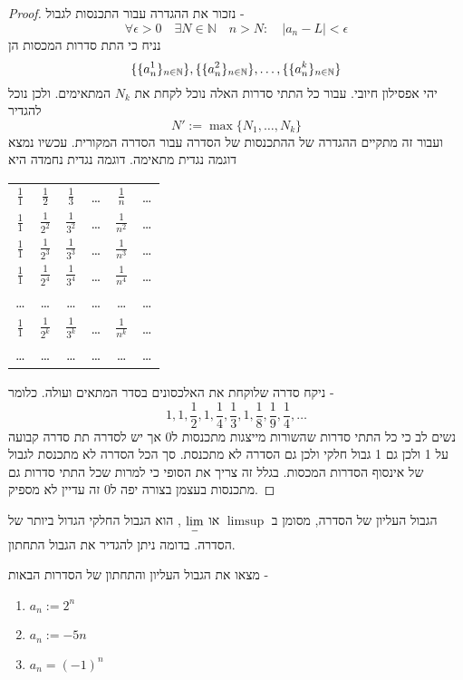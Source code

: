 \documentclass{article}
\begin{document}
\begin{proof}
נזכור את ההגדרה עבור התכנסות לגבול - 
\[\forall\epsilon>0\quad \exists N\in\mathbb{N} \quad n> N:\quad |a_n-L|<\epsilon\]
נניח כי התת סדרות המכסות הן
\[\{\{a_n^1\}_{n\in\mathbb{N}}\},\{\{a_n^2\}_{n\in\mathbb{N}}\},\dots,\{\{a_n^k\}_{n\in\mathbb{N}}\}\]
יהי אפסילון חיובי. עבור כל התתי סדרות האלה נוכל לקחת את 
$N_k$
המתאימים. ולכן נוכל להגדיר 
\[N':=\max\{N_1,\dots,N_k\}\]
ועבור זה מתקיים ההגדרה של ההתכנסות של הסדרה עבור הסדרה המקורית. עכשיו נמצא דוגמה נגדית מתאימה. דוגמה נגדית נחמדה היא 
\begin{center}
\begin{tabular}{ c c c c c c}
 $\frac{1}{1}$ & $\frac{1}{2}$ & $\frac{1}{3}$ & \dots & $\frac{1}{n}$ &\dots \\ 
 $\frac{1}{1}$ & $\frac{1}{2^2}$ & $\frac{1}{3^2}$ & \dots & $\frac{1}{n^2}$ &\dots \\  
 $\frac{1}{1}$ & $\frac{1}{2^3}$ & $\frac{1}{3^3}$ & \dots & $\frac{1}{n^3}$ &\dots \\   
 $\frac{1}{1}$ & $\frac{1}{2^4}$ & $\frac{1}{3^4}$ & \dots & $\frac{1}{n^4}$ &\dots \\  
 \dots & \dots & \dots & \dots & \dots &\dots \\ 
 $\frac{1}{1}$ & $\frac{1}{2^k}$ & $\frac{1}{3^k}$ & \dots & $\frac{1}{n^k}$ &\dots \\   
 \dots & \dots & \dots & \dots & \dots &\dots
\end{tabular}
\end{center}
ניקח סדרה שלוקחת את האלכסונים בסדר המתאים ועולה. כלומר - 
\[1, 1, \frac{1}{2}, 1,\frac{1}{4},\frac{1}{3},1, \frac{1}{8}, \frac{1}{9},\frac{1}{4},\dots\]
נשים לב כי כל התתי סדרות שהשורות מייצגות מתכנסות ל0 אך יש לסדרה תת סדרה קבועה על 1 ולכן גם 1 גבול חלקי ולכן גם הסדרה לא מתכנסת. סך הכל הסדרה לא מתכנסת לגבול של אינסוף הסדרות המכסות. בגלל זה צריך את הסופי כי למרות שכל התתי סדרות גם מתכנסות בעצמן בצורה יפה ל0 זה עדיין לא מספיק.
\end{proof}

\begin{definition}
הגבול העליון של הסדרה, מסומן ב 
$\limsup$ 
או 
$\underset{-}{\lim}$
, הוא הגבול החלקי הגדול ביותר של הסדרה. בדומה ניתן להגדיר את הגבול התחתון. 
\end{definition}

\begin{exercise}
מצאו את הגבול העליון והתחתון של הסדרות הבאות - 
\begin{enumerate}
\item $a_n:=2^n$
\item $a_n:=-5n$
\item $a_n=(-1)^n$
\end{enumerate}
\end{exercise}
\end{document}
